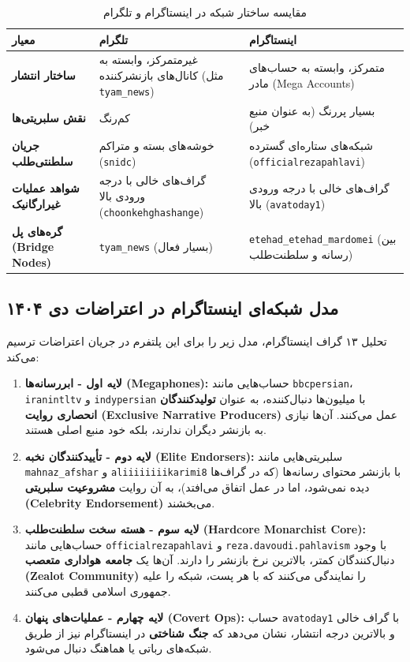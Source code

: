 \documentclass{article}
\begin{document}
	\begin{longtable}{l p{5cm} p{5cm}}
		\caption{مقایسه ساختار شبکه در اینستاگرام و تلگرام}
		\label{tab:comparison} \\
		\toprule
		\textbf{معیار} & \textbf{تلگرام} & \textbf{اینستاگرام} \\
		\midrule
		\textbf{ساختار انتشار} & غیرمتمرکز، وابسته به کانال‌های بازنشرکننده (مثل \texttt{tyam\_news}) & متمرکز، وابسته به حساب‌های مادر (Mega Accounts) \\
		\textbf{نقش سلبریتی‌ها} & کم‌رنگ & بسیار پررنگ (به عنوان منبع خبر) \\
		\textbf{جریان سلطنتی‌طلب} & خوشه‌های بسته و متراکم (\texttt{snidc}) & شبکه‌های ستاره‌ای گسترده (\texttt{officialrezapahlavi}) \\
		\textbf{شواهد عملیات غیرارگانیک} & گراف‌های خالی با درجه ورودی بالا (\texttt{choonkehghashange}) & گراف‌های خالی با درجه ورودی بالا (\texttt{avatoday1}) \\
		\textbf{گره‌های پل (Bridge Nodes)} & \texttt{tyam\_news} (بسیار فعال) & \texttt{etehad\_etehad\_mardomei} (بین رسانه و سلطنت‌طلب) \\
		\bottomrule
	\end{longtable}
	
	\subsection{مدل شبکه‌ای اینستاگرام در اعتراضات دی ۱۴۰۴}
	تحلیل ۱۳ گراف اینستاگرام، مدل زیر را برای این پلتفرم در جریان اعتراضات ترسیم می‌کند:
	
	\begin{enumerate}
		\item \textbf{لایه اول - ابررسانه‌ها (Megaphones):} حساب‌هایی مانند \texttt{bbcpersian}، \texttt{iranintltv} و \texttt{indypersian} با میلیون‌ها دنبال‌کننده، به عنوان \textbf{تولیدکنندگان انحصاری روایت (Exclusive Narrative Producers)} عمل می‌کنند. آن‌ها نیازی به بازنشر دیگران ندارند، بلکه خود منبع اصلی هستند.
		\item \textbf{لایه دوم - تأییدکنندگان نخبه (Elite Endorsers):} سلبریتی‌هایی مانند \texttt{mahnaz\_afshar} و \texttt{aliiiiiiiikarimi8} با بازنشر محتوای رسانه‌ها (که در گراف‌ها دیده نمی‌شود، اما در عمل اتفاق می‌افتد)، به آن روایت \textbf{مشروعیت سلبریتی (Celebrity Endorsement)} می‌بخشند.
		\item \textbf{لایه سوم - هسته سخت سلطنت‌طلب (Hardcore Monarchist Core):} حساب‌هایی مانند \texttt{officialrezapahlavi} و \texttt{reza.davoudi.pahlavism} با وجود دنبال‌کنندگان کمتر، بالاترین نرخ بازنشر را دارند. آن‌ها یک \textbf{جامعه هواداری متعصب (Zealot Community)} را نمایندگی می‌کنند که با هر پست، شبکه را علیه جمهوری اسلامی قطبی می‌کنند.
		\item \textbf{لایه چهارم - عملیات‌های پنهان (Covert Ops):} حساب \texttt{avatoday1} با گراف خالی و بالاترین درجه انتشار، نشان می‌دهد که \textbf{جنگ شناختی} در اینستاگرام نیز از طریق شبکه‌های رباتی یا هماهنگ دنبال می‌شود.
	\end{enumerate}
	
\end{document}
